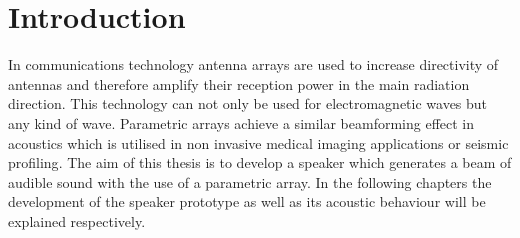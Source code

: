 \chapter{Introduction}


In communications technology antenna arrays are used to increase directivity of antennas and therefore amplify their reception power in the main radiation direction.\cite{netzberger_kommunikationstechnologie_2021-2} This technology can not only be used for electromagnetic waves but any kind of wave. Parametric arrays achieve a similar beamforming effect in acoustics which is utilised in non invasive medical imaging applications\cite{novelline_squires_1997}\cite{konofagou_focused_2001} or seismic profiling\cite{muir_highresolution_1984}.\p
The aim of this thesis is to develop a speaker which generates a beam of audible sound with the use of a parametric array.
In the following chapters the development of the speaker prototype as well as its acoustic behaviour will be explained respectively.
